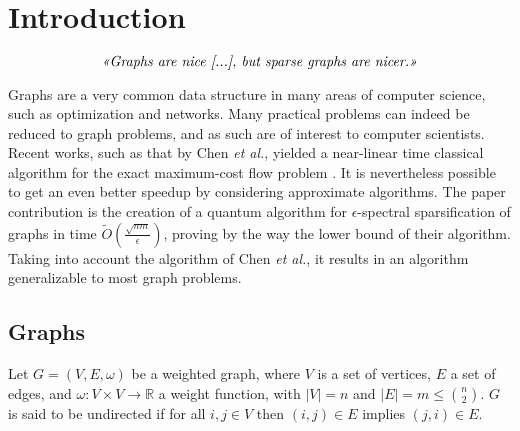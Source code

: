 \section{Introduction}

\begin{equation*}
    \textit{\guillemotleft Graphs are nice [...], but sparse graphs are nicer.\guillemotright}
\end{equation*}

Graphs are a very common data structure in many areas of computer science, such
as optimization and networks. Many practical problems can indeed be reduced to graph problems, and as such are of interest to computer
scientists. Recent works, such as that by Chen \textit{et al.}, yielded a near-linear time classical algorithm
for the exact maximum-cost flow problem \cite{chen_maximum_2022}. It is
nevertheless possible to get an even better speedup by considering approximate
algorithms. The paper contribution is the creation of a quantum algorithm for
$\epsilon$-spectral sparsification of graphs in time
$\tilde{O}(\frac{\sqrt{nm}}{\epsilon})$, proving by the way the lower bound of
their algorithm. Taking into account the algorithm of Chen \textit{et al.}, it
results in an algorithm generalizable to most graph problems.

\subsection{Graphs}
Let $G = (V, E, \omega)$ be a weighted graph, where $V$ is a set of vertices,
$E$ a  set of edges, and $\omega : V \times V \rightarrow \mathbb{R}$ a weight
function, with $|V| = n$ and $|E| = m \leq \binom{n}{2}$. $G$ is said to be
undirected if for all $i,j \in V$ then  $(i,j) \in E$ implies $(j,i) \in E$.

\begin{Figure}
    \centering
    \label{fig:weighted-graph-example}
\end{Figure}


